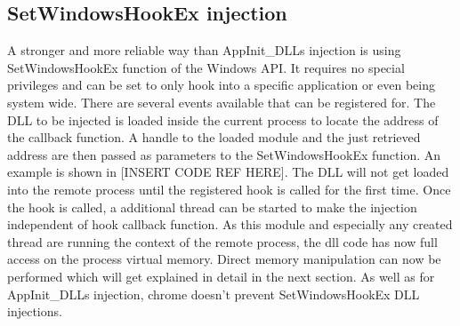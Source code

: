 \subsection{SetWindowsHookEx injection}
A stronger and more reliable way than AppInit\_DLLs injection is using SetWindowsHookEx function of the Windows API. It requires no special privileges and can be set to only hook into a specific application or even being system wide. There are several events available that can be registered for. The DLL to be injected is loaded inside the current process to locate the address of the callback function. A handle to the loaded module and the just retrieved address are then passed as parameters to the SetWindowsHookEx function. An example is shown in [INSERT CODE REF HERE]. The DLL will not get loaded into the remote process until the registered hook is called for the first time. Once the hook is called, a additional thread can be started to make the injection independent of hook callback function. As this module and especially any created thread are running the context of the remote process, the dll code has now full access on the process virtual memory. Direct memory manipulation can now be performed which will get explained in detail in the next section. As well as for AppInit\_DLLs injection, chrome doesn't prevent SetWindowsHookEx DLL injections.